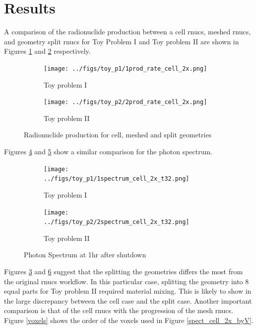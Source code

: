 \section{Results}

A comparison of the radionuclide production between a cell rnucs, meshed rnucs, and geometry split rnucs  for Toy Problem 
I and Toy problem II are shown 
in Figures \ref{1prod_cell_2x} and \ref{2prod_cell_2x} respectively. \\
\begin{figure}[h]
 \begin{centering}
 \centering
 \begin{subfigure}[b]{.45\textwidth}
 \texttt{[image: ../figs/toy\_p1/1prod\_rate\_cell\_2x.png]}
 \caption{Toy problem I }
 \label{1prod_cell_2x}
 \end{subfigure}
 \hspace{0.05cm}
 \begin{subfigure}[b]{.45\textwidth}
 \centering
 \texttt{[image: ../figs/toy\_p2/2prod\_rate\_cell\_2x.png]}
 \caption{Toy problem II}
 \label{2prod_cell_2x}
 \end{subfigure}
 \caption{Radionuclide production for cell, meshed and split geometries}
 \label{prod_cell_2x}
 \end{centering}
\end{figure}
Figures \ref{1spect_cell_2x} and \ref{2spect_cell_2x} show a similar comparison for the photon spectrum.  \\

\begin{figure}[h!]
 \begin{centering}
 \centering
 \begin{subfigure}[b]{.45\textwidth}
 \texttt{[image: ../figs/toy\_p1/1spectrum\_cell\_2x\_t32.png]}
 \caption{Toy problem I }
 \label{1spect_cell_2x}
 \end{subfigure}
 \hspace{0.05cm}
 \begin{subfigure}[b]{.45\textwidth}
 \centering
 \texttt{[image: ../figs/toy\_p2/2spectrum\_cell\_2x\_t32.png]}
 \caption{Toy problem II}
 \label{2spect_cell_2x}
 \end{subfigure}
 \caption{Photon Spectrum at 1hr after shutdown }
 \label{spect_cell_2x}
 \end{centering}
\end{figure}
Figures \ref{prod_cell_2x} and \ref{spect_cell_2x} suggest that the splitting the geometries 
differs the most from the original rnucs workflow. In this particular case, splitting the geometry 
into 8 equal parts for Toy problem II required material mixing. This is likely to show in the large 
discrepancy between the cell case and the split case. 
Another important comparison is that of the cell rnucs with the progression of the mesh rnucs. 
Figure \ref{voxels} shows the order of the voxels used in Figure \ref{spect_cell_2x_byV}. 


